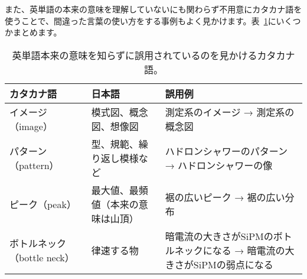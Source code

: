 また、英単語の本来の意味を理解していないにも関わらず不用意にカタカナ語を使うことで、間違った言葉の使い方をする事例もよく見かけます。表~\ref{wrong_katakana}にいくつかまとめます。

\begin{table}
  \centering
  \caption{英単語本来の意味を知らずに誤用されているのを見かけるカタカナ語。}
  \begin{tabular}{lll}
    \hline
    カタカナ語 & 日本語 & 誤用例 \\
    \hline
    イメージ（image） & 模式図、概念図、想像図 & 測定系のイメージ → 測定系の概念図 \\
    パターン（pattern） & 型、規範、繰り返し模様など & ハドロンシャワーのパターン → ハドロンシャワーの像 \\
    ピーク（peak） & 最大値、最頻値（本来の意味は山頂） & 裾の広いピーク → 裾の広い分布 \\
    ボトルネック（bottle neck） & 律速する物 & 暗電流の大きさがSiPMのボトルネックになる → 暗電流の大きさがSiPMの弱点になる \\
    \hline
  \end{tabular}
  \label{wrong_katakana}
\end{table}

